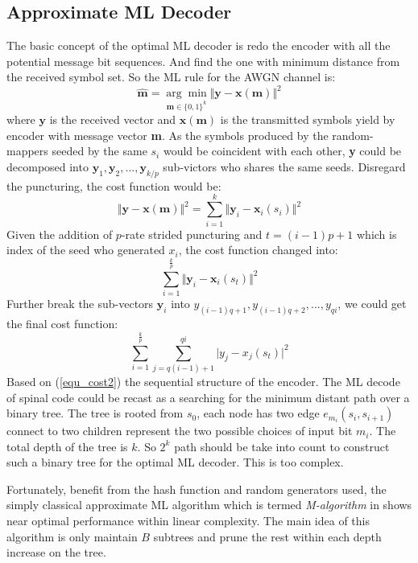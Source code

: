 \documentclass[conference]{IEEEtran}
\begin{document}
\subsection{Approximate ML Decoder}
The basic concept of the optimal ML decoder is 	redo the encoder with all the potential message bit sequences. And find the one with minimum distance from the received symbol set. So the ML rule for the AWGN channel is:
\begin{equation}
\widehat{\textbf{m}}=\underset{\textbf{m}\in\{0,1\}^k}{\arg\min}\Vert\textbf{y}-\textbf{x}(\textbf{m})\Vert^2
\label{equ_ml}
\end{equation}
where $\textbf{y}$ is the received vector and $\textbf{x}(\textbf{m})$ is the transmitted symbols yield by encoder with message vector \textbf{m}.
As the  symbols produced by the random-mappers seeded by the same $s_i$ would be coincident with each other, \textbf{y} could be decomposed into $\textbf{y}_1,\textbf{y}_2,...,\textbf{y}_{k/p}$ sub-victors who shares the same seeds. Disregard the puncturing, the cost function would be:
\begin{equation}
\Vert\textbf{y}-\textbf{x}(\textbf{m})\Vert^2=\sum_{i=1}^{k}\Vert\textbf{y}_{i}-\textbf{x}_{i}(s_{i})\Vert^2
\label{equ_cost0}
\end{equation}
Given the addition of $p$-rate strided puncturing and $t =(i-1)p+1$ which is index of the seed who generated $x_i$, the cost function changed into:
\begin{equation}
\sum_{i=1}^{\frac{k}{p}}\Vert\textbf{y}_{i}-\textbf{x}_{i}(s_{t})\Vert^2
\label{equ_cost1}
\end{equation}
Further break the sub-vectors $\textbf{y}_i$ into $y_{(i-1)q+1},y_{(i-1)q+2},...,y_{qi}$, we could get the final  cost function:%
\begin{equation}
\sum_{i=1}^{\frac{k}{p}}\sum_{j=q(i-1)+1}^{qi}\vert y_{j}-x_{j}(s_{t})\vert^2
\label{equ_cost2}
\end{equation}
Based on (\ref{equ_cost2}) the sequential structure of the encoder. The ML decode of spinal code could be recast as a searching for the minimum distant path over a binary tree. The tree is rooted from $s_0$, each node has two edge $e_{m_i}(s_i,s_{i+1})$ connect to two children represent the two possible choices of input bit $m_i$. The total depth of the tree is $k$. So $2^k$ path should be take into count to construct such a binary tree for the optimal ML decoder. This is too complex. 

Fortunately, benefit from the hash function and random generators used, the simply classical approximate ML algorithm which is termed \textit{M-algorithm} in \cite{Anderson1984} shows near optimal performance within linear complexity. The main idea of this algorithm is only maintain $B$ subtrees and prune the rest within each depth increase on the tree. 
\end{document}
